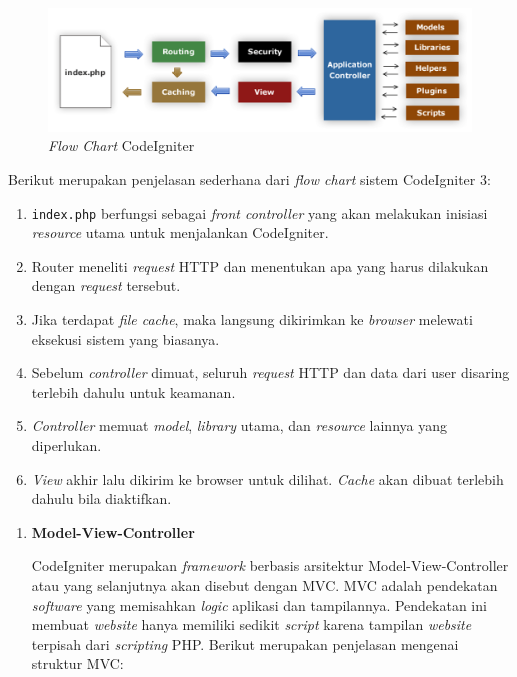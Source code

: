 \documentclass[a4paper,twoside]{article}
\begin{document}
\begin{enumerate}
	      \begin{figure}[H]
		      \centering
		      \includegraphics[scale=0.3]{ci-flowchart.png}
		      \caption{\textit{Flow Chart} CodeIgniter}
		      \label{fig:2:ciflowchart}
	      \end{figure}

	      Berikut merupakan penjelasan sederhana dari \textit{flow chart} sistem CodeIgniter 3:

	      \begin{enumerate}
		      \item \verb|index.php| berfungsi sebagai \textit{front controller} yang akan melakukan inisiasi \textit{resource} utama untuk menjalankan CodeIgniter.
		      \item Router meneliti \textit{request} HTTP dan menentukan apa yang harus dilakukan dengan \textit{request} tersebut.
		      \item Jika terdapat \textit{file cache}, maka langsung dikirimkan ke \textit{browser} melewati eksekusi sistem yang biasanya.
		      \item Sebelum \textit{controller} dimuat, seluruh \textit{request} HTTP dan data dari user disaring terlebih dahulu untuk keamanan.
		      \item \textit{Controller} memuat \textit{model}, \textit{library} utama, dan \textit{resource} lainnya yang diperlukan.
		      \item \textit{View} akhir lalu dikirim ke browser untuk dilihat. \textit{Cache} akan dibuat terlebih dahulu bila diaktifkan.
	      \end{enumerate}

	      \begin{enumerate}
		      \item \textbf{Model-View-Controller}
		            \label{sub:2:2:modelviewcontroller}

		            CodeIgniter merupakan \textit{framework} berbasis arsitektur Model-View-Controller atau yang selanjutnya akan disebut dengan MVC. MVC adalah pendekatan \textit{software} yang memisahkan \textit{logic} aplikasi dan tampilannya. Pendekatan ini membuat \textit{website} hanya memiliki sedikit \textit{script} karena tampilan \textit{website} terpisah dari \textit{scripting} PHP. Berikut merupakan penjelasan mengenai struktur MVC:


\end{enumerate}
\end{enumerate}
\end{document}
